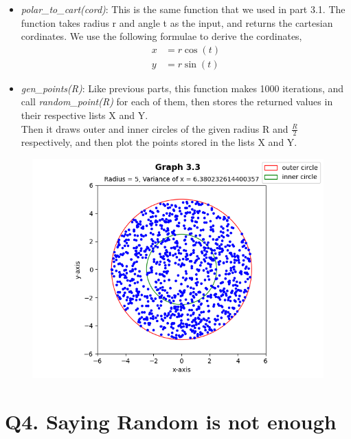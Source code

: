 \documentclass[answers]{exam}
\begin{document}
\begin{framed}
\begin{itemize}
    \item \emph{polar\_to\_cart(cord)}: This is the same function that we used in part 3.1. The function takes radius r and angle t as the input, and returns the cartesian cordinates. We use the following formulae to derive the cordinates,\\
      \begin{align*}
        x &= r\cos(t)\\
        y &= r\sin(t)
      \end{align*}
    \item \emph{gen\_points(R)}: Like previous parts, this function makes 1000 iterations, and call \emph{random\_point(R)} for each of them, then stores the returned values in their respective lists X and Y.\\
      Then it draws outer and inner circles of the given radius R and $\frac{R}{2}$ respectively, and then plot the points stored in the lists X and Y.
  \end{itemize}
\end{framed}


\begin{figure}[h]
  \centering
  \includegraphics[scale=0.7]{Q3/Q3(3).png}
\end{figure}
\newpage

\section*{Q4. Saying Random is not enough}

\end{document}
